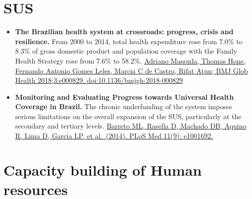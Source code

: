 \documentclass[]{book}
\begin{document}
\hypertarget{sus}{%
\section*{SUS}\label{sus}}

\begin{itemize}
\item
  \textbf{The Brazilian health system at crossroads: progress, crisis and resilience.} From 2000 to 2014, total health expenditure rose from 7.0\% to 8.3\% of gross domestic product and population coverage with the Family Health Strategy rose from 7.6\% to 58.2\%. \href{https://journals.plos.org/plosmedicine/article/file?id=10.1371/journal.pmed.1001692\&type=printable}{Adriano Massuda, Thomas Hone, Fernando Antonio Gomes Leles, Marcia C de Castro, Rifat Atun; BMJ Glob Health 2018;3:e000829. doi:10.1136/bmjgh-2018-000829}
\item
  \textbf{Monitoring and Evaluating Progress towards Universal Health Coverage in Brazil.} The chronic underfunding of the system imposes serious limitations on the overall expansion of the SUS, particularly at the secondary and tertiary levels. \href{https://journals.plos.org/plosmedicine/article?id=10.1371/journal.pmed.1001692\#}{Barreto ML, Rasella D, Machado DB, Aquino R, Lima D, Garcia LP, et al.~(2014). PLoS Med 11(9): e1001692.}
\end{itemize}

\hypertarget{capacity-building-of-human-resources}{%
\section*{Capacity building of Human resources}\label{capacity-building-of-human-resources}}
\end{document}
